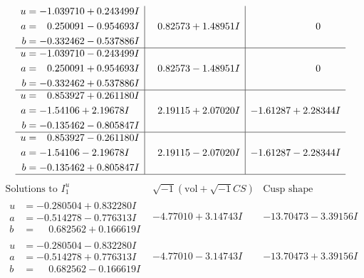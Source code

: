 \documentclass[1p]{elsarticle_modified}
\theoremstyle{definition}
\newcommand{\I}{\sqrt{-1}}
\begin{document}
$$\begin{array}{c|c|c}
\begin{aligned}
u &= -1.039710 + 0.243499 I \\
a &= \phantom{-}0.250091 - 0.954693 I \\
b &= -0.332462 - 0.537886 I\end{aligned}
 & \phantom{-}0.82573 + 1.48951 I & \phantom{-0.000000 } 0 \\ \hline\begin{aligned}
u &= -1.039710 - 0.243499 I \\
a &= \phantom{-}0.250091 + 0.954693 I \\
b &= -0.332462 + 0.537886 I\end{aligned}
 & \phantom{-}0.82573 - 1.48951 I & \phantom{-0.000000 } 0 \\ \hline\begin{aligned}
u &= \phantom{-}0.853927 + 0.261180 I \\
a &= -1.54106 + 2.19678 I \\
b &= -0.135462 - 0.805847 I\end{aligned}
 & \phantom{-}2.19115 + 2.07020 I & -1.61287 + 2.28344 I \\ \hline\begin{aligned}
u &= \phantom{-}0.853927 - 0.261180 I \\
a &= -1.54106 - 2.19678 I \\
b &= -0.135462 + 0.805847 I\end{aligned}
 & \phantom{-}2.19115 - 2.07020 I & -1.61287 - 2.28344 I\\
 \hline 
 \end{array}$$\newpage$$\begin{array}{c|c|c}  
\text{Solutions to }I^u_{1}& \I (\text{vol} + \sqrt{-1}CS) & \text{Cusp shape}\\
 \hline 
\begin{aligned}
u &= -0.280504 + 0.832280 I \\
a &= -0.514278 - 0.776313 I \\
b &= \phantom{-}0.682562 + 0.166619 I\end{aligned}
 & -4.77010 + 3.14743 I & -13.70473 - 3.39156 I \\ \hline\begin{aligned}
u &= -0.280504 - 0.832280 I \\
a &= -0.514278 + 0.776313 I \\
b &= \phantom{-}0.682562 - 0.166619 I\end{aligned}
 & -4.77010 - 3.14743 I & -13.70473 + 3.39156 I \\ \hline\begin{aligned}

\end{aligned}
\end{array}$$
\end{document}
